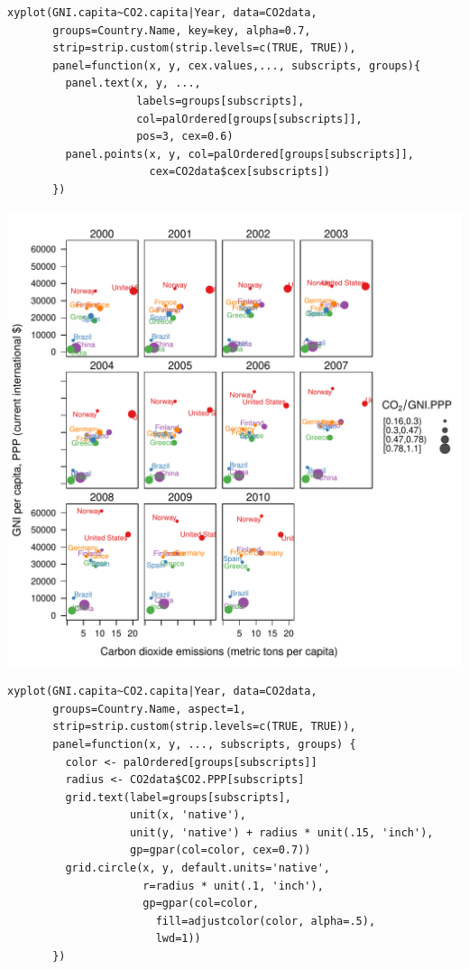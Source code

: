 \lstset{language=R}
\begin{lstlisting}
xyplot(GNI.capita~CO2.capita|Year, data=CO2data,
       groups=Country.Name, key=key, alpha=0.7,
       strip=strip.custom(strip.levels=c(TRUE, TRUE)),
       panel=function(x, y, cex.values,..., subscripts, groups){
         panel.text(x, y, ...,
                    labels=groups[subscripts],
                    col=palOrdered[groups[subscripts]],
                    pos=3, cex=0.6)
         panel.points(x, y, col=palOrdered[groups[subscripts]],
                      cex=CO2data$cex[subscripts])
       })
\end{lstlisting}

\includegraphics[width=.9\linewidth]{figs/CO2points.pdf}


\lstset{language=R}
\begin{lstlisting}
xyplot(GNI.capita~CO2.capita|Year, data=CO2data,
       groups=Country.Name, aspect=1,
       strip=strip.custom(strip.levels=c(TRUE, TRUE)),
       panel=function(x, y, ..., subscripts, groups) {
         color <- palOrdered[groups[subscripts]]
         radius <- CO2data$CO2.PPP[subscripts]
         grid.text(label=groups[subscripts],
                   unit(x, 'native'),
                   unit(y, 'native') + radius * unit(.15, 'inch'),
                   gp=gpar(col=color, cex=0.7))
         grid.circle(x, y, default.units='native',
                     r=radius * unit(.1, 'inch'),
                     gp=gpar(col=color,
                       fill=adjustcolor(color, alpha=.5),
                       lwd=1))
       })
\end{lstlisting}

